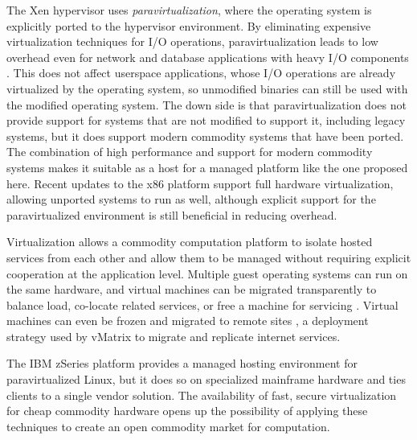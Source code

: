 The Xen hypervisor uses \emph{paravirtualization}, where the operating system is explicitly ported to the hypervisor environment. By eliminating expensive virtualization techniques for I/O operations, paravirtualization leads to low overhead even for network and database applications with heavy I/O components \cite{barham}. This does not affect userspace applications, whose I/O operations are already virtualized by the operating system, so unmodified binaries can still be used with the modified operating system. The down side is that paravirtualization does not provide support for systems that are not modified to support it, including legacy systems, but it does support modern commodity systems that have been ported. The combination of high performance and support for modern commodity systems makes it suitable as a host for a managed platform like the one proposed here. Recent updates to the x86 platform support full hardware virtualization, allowing unported systems to run as well, although explicit support for the paravirtualized environment is still beneficial in reducing overhead.


Virtualization allows a commodity computation platform to isolate hosted services from each other and allow them to be managed without requiring explicit cooperation at the application level. Multiple guest operating systems can run on the same hardware, and virtual machines can be migrated transparently to balance load, co-locate related services, or free a machine for servicing \cite{clark}. Virtual machines can even be frozen and migrated to remote sites \cite{sapuntzakis02}, a deployment strategy used by vMatrix \cite{awadallah} to migrate and replicate internet services.

The IBM zSeries \cite{ibmzseries} platform provides a managed hosting environment for paravirtualized Linux, but it does so on specialized mainframe hardware and ties clients to a single vendor solution. The availability of fast, secure virtualization for cheap commodity hardware opens up the possibility of applying these techniques to create an open commodity market for computation.


